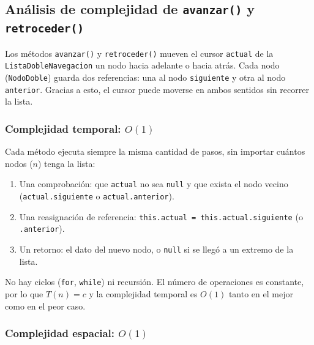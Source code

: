 
\subsection{Análisis de complejidad de \texttt{avanzar()} y \texttt{retroceder()}}

Los métodos \texttt{avanzar()} y \texttt{retroceder()} mueven el cursor
\texttt{actual} de la \texttt{ListaDobleNavegacion} un nodo hacia adelante o
hacia atrás. Cada nodo (\texttt{NodoDoble}) guarda dos referencias: una al nodo
\texttt{siguiente} y otra al nodo \texttt{anterior}. Gracias a esto, el cursor
puede moverse en ambos sentidos sin recorrer la lista.

\subsubsection*{Complejidad temporal: $O(1)$}

Cada método ejecuta siempre la misma cantidad de pasos, sin importar cuántos
nodos ($n$) tenga la lista:

\begin{enumerate}[leftmargin=*]
  \item Una comprobación: que \texttt{actual} no sea \texttt{null} y que exista
        el nodo vecino (\texttt{actual.siguiente} o \texttt{actual.anterior}).
  \item Una reasignación de referencia: \texttt{this.actual = this.actual.siguiente}
        (o \texttt{.anterior}).
  \item Un retorno: el dato del nuevo nodo, o \texttt{null} si se llegó a un
        extremo de la lista.
\end{enumerate}

No hay ciclos (\texttt{for}, \texttt{while}) ni recursión. El número de
operaciones es constante, por lo que $T(n) = c$ y la complejidad temporal es
$O(1)$ tanto en el mejor como en el peor caso.

\subsubsection*{Complejidad espacial: $O(1)$}

